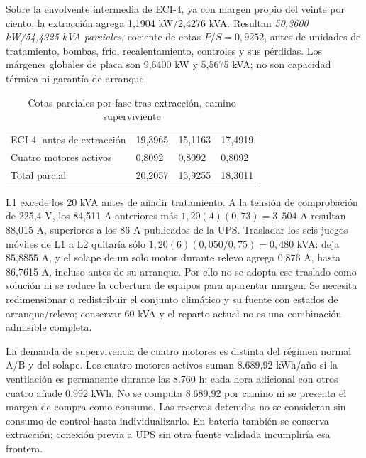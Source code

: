 Sobre la envolvente intermedia de ECI-4, ya con margen propio del veinte por ciento, la extracción agrega 1,1904 kW/2,4276 kVA. Resultan \emph{50,3600 kW/54,4325 kVA parciales}, cociente de cotas $P/S=0,9252$, antes de unidades de tratamiento, bombas, frío, recalentamiento, controles y sus pérdidas. Los márgenes globales de placa son 9,6400 kW y 5,5675 kVA; no son capacidad térmica ni garantía de arranque.

\begin{table}[htbp]
\centering\small
\caption{Cotas parciales por fase tras extracción, camino superviviente}\label{tab:sd4-fases-eci20}
\begin{tabularx}{\linewidth}{X R{25mm} R{25mm} R{25mm}}
\hline
{} &  &  &  \\ \hline
ECI-4, antes de extracción & 19,3965 & 15,1163 & 17,4919 \\ \hline
Cuatro motores activos & 0,8092 & 0,8092 & 0,8092 \\ \hline
Total parcial & 20,2057 & 15,9255 & 18,3011 \\ \hline
\end{tabularx}
\end{table}

L1 excede los 20 kVA antes de añadir tratamiento. A la tensión de comprobación de 225,4 V, los 84,511 A anteriores más $1,20(4)(0,73)=3,504$ A resultan 88,015 A, superiores a los 86 A publicados de la UPS. Trasladar los seis juegos móviles de L1 a L2 quitaría sólo $1,20(6)(0,050/0,75)=0,480$ kVA: deja 85,8855 A, y el solape de un solo motor durante relevo agrega 0,876 A, hasta 86,7615 A, incluso antes de su arranque. Por ello no se adopta ese traslado como solución ni se reduce la cobertura de equipos para aparentar margen. Se necesita redimensionar o redistribuir el conjunto climático y su fuente con estados de arranque/relevo; conservar 60 kVA y el reparto actual no es una combinación admisible completa.

La demanda de supervivencia de cuatro motores es distinta del régimen normal A/B y del solape. Los cuatro motores activos suman 8.689,92 kWh/año si la ventilación es permanente durante las 8.760 h; cada hora adicional con otros cuatro añade 0,992 kWh. No se computa 8.689,92 por camino ni se presenta el margen de compra como consumo. Las reservas detenidas no se consideran sin consumo de control hasta individualizarlo. En batería también se conserva extracción; conexión previa a UPS sin otra fuente validada incumpliría esa frontera.

